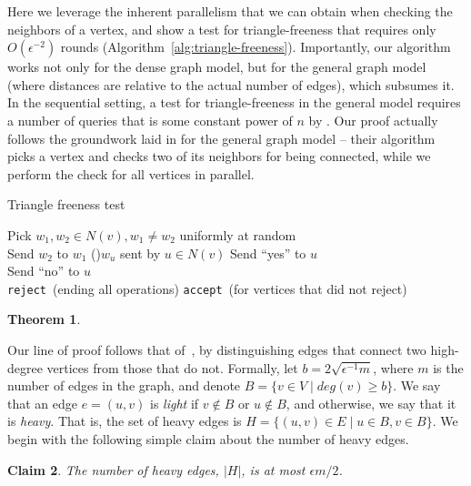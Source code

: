 \documentclass[11pt]{article}
\newtheorem{theorem}{Theorem}[section]
\newtheorem{claim}[theorem]{Claim}
\newcommand{\accept}{\texttt{accept}}
\newcommand{\reject}{\texttt{reject}}
\begin{document}
Here we leverage the inherent parallelism that we can obtain when checking the neighbors of a vertex, and show a test for triangle-freeness that requires only $O(\epsilon^{-2})$ rounds (Algorithm~\ref{alg:triangle-freeness}). Importantly, our algorithm works not only for the dense graph model, but for the general graph model (where distances are relative to the actual number of edges), which subsumes it. In the sequential setting, a test for triangle-freeness in the general model requires a number of queries that is some constant power of $n$ by \cite{AKKR}. Our proof actually follows the groundwork laid in \cite{AKKR} for the general graph model -- their algorithm picks a vertex and checks two of its neighbors for being connected, while we perform the check for all vertices in parallel.

\begin{algorithm}[htbp]
\caption{Triangle freeness test\label{alg:triangle-freeness}}
{
	{	
		Pick $w_1, w_2 \in N(v), w_1 \neq w_2$ uniformly at random \\
		Send $w_2$ to $w_1$ 
		\ForEach(){$w_u$ sent by $u \in N(v)$}
		{
			{
				Send ``yes'' to $u$\\
			}
			\Else
			{
				Send ``no'' to $u$\\
			}
		}
		{
					\reject ~(ending all operations)
		}
	}
}
\accept ~(for vertices that did not reject)
\end{algorithm}


\begin{theorem}
\label{thm:tri}
\ThmTri
\end{theorem}

Our line of proof follows that of~\cite{AKKR}, by distinguishing edges that connect two high-degree vertices from those that do not. Formally, let $b = 2\sqrt{\epsilon^{-1} m}$, where $m$ is the number of edges in the graph, and denote $B=\{v \in V \mid deg(v) \geq b\}$. We say that an edge $e=(u,v)$ is \emph{light} if $v \not\in B$ or $u \not\in B$, and otherwise, we say that it is \emph{heavy}. That is, the set of heavy edges is $H = \{(u,v)\in E \mid u \in B, v \in B\}$. We begin with the following simple claim about the number of heavy edges.

\begin{claim}
\label{claim:tri-heavy}
The number of heavy edges, $|H|$, is at most $\epsilon m / 2$.
\end{claim}
\end{document}
